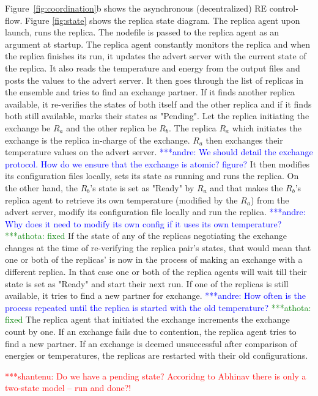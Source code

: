 \documentclass{rspublic}
\newcommand{\jhanote}[1]{ {\textcolor{red} { ***shantenu: #1 }}}
\newcommand{\alnote}[1]{ {\textcolor{blue} { ***andre: #1 }}}
\newcommand{\athotanote}[1]{ {\textcolor{green} { ***athota: #1 }}}
\newcommand{\alnote}[1]{}
\newcommand{\athotanote}[1]{}
\newcommand{\jhanote}[1]{}
\begin{document}
Figure~\ref{fig:coordination}b shows the asynchronous (decentralized) RE
control-flow. Figure \ref{fig:state} shows the replica state diagram. The replica agent upon launch, runs the replica. The nodefile is passed to the replica agent as an argument at startup. The replica agent constantly monitors the replica and when the replica finishes its run, it updates the advert server with
the current state of the replica. It also reads the temperature and
energy from the output files and posts the values to the advert
server. It then goes through the list of replicas in the ensemble and tries to find an
exchange partner. If it finds another replica available, it
re-verifies the states of both itself and the other replica and if it
finds both still available, marks their states as "Pending". Let the replica initiating the exchange be $R_a$ and the other replica be $R_b$.
The replica $R_a$ which initiates the exchange is the replica in-charge of the exchange. $R_a$
then exchanges their temperature values on the advert server.  \alnote{We
  should detail the exchange protocol. How do we ensure that the
  exchange is atomic? figure?}  It then modifies its configuration
files locally, sets its state as running and runs the replica. On the
other hand, the $R_b$'s state is set as "Ready" by $R_a$ and that
makes the $R_b$'s replica agent to retrieve its own
temperature (modified by the $R_a$) from the advert server, modify its configuration file
locally and run the replica. \alnote{Why does it need to modify its
  own config if it uses its own temperature?} \athotanote{fixed} If the state of any of the replicas negotiating the exchange changes at the time of re-verifying the replica pair's states, that would mean that one or both of the replicas' is now in the process of making an exchange with a different replica. In that case one or both of the replica agents will wait till their state is set as "Ready" and start their next run. If one of the replicas is still available, it tries to find a new partner for exchange.  \alnote{How often is the process repeated until the replica
  is started with the old temperature?} \athotanote{fixed}The replica agent that
initiated the exchange increments the exchange count by one.
If an exchange fails due to contention, the replica agent tries to find a new partner. If an exchange is deemed unsuccessful after comparison of energies or temperatures, the replicas are restarted with their old configurations. 

\jhanote{Do we have a pending state? Accoridng to Abhinav there is
  only a two-state model -- run and done?!} 
\end{document}
